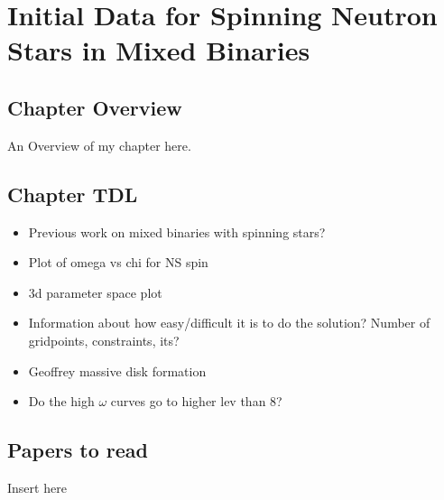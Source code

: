 \chapter{Initial Data for Spinning Neutron Stars in Mixed Binaries}

\section{Chapter Overview}

An Overview of my chapter here.

\section{Chapter TDL}
\begin{itemize}
\item Previous work on mixed binaries with spinning stars?
\item Plot of omega vs chi for NS spin
\item 3d parameter space plot
\item Information about how easy/difficult it is to do the solution?
  Number of gridpoints, constraints, its?
\item Geoffrey massive disk formation 
\item Do the high $\omega$ curves go to higher lev than 8?
\end{itemize}


\section{Papers to read}

Insert here






